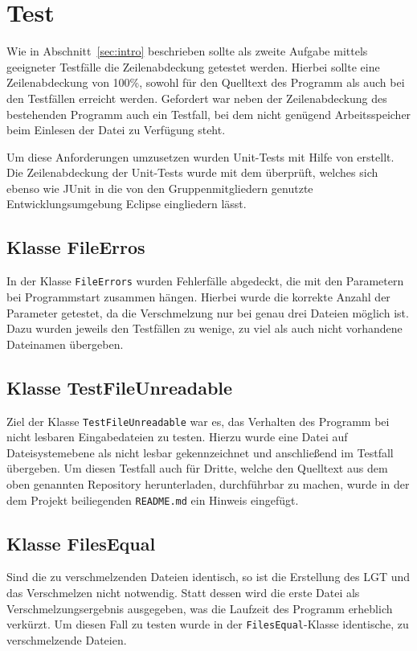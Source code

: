 \documentclass[a4paper,titlepage,12pt]{scrartcl}
\begin{document}
\section{Test}
\label{sec:test}

Wie in Abschnitt~\ref{sec:intro} beschrieben sollte als zweite Aufgabe mittels geeigneter Testfälle die Zeilenabdeckung getestet werden.
Hierbei sollte eine Zeilenabdeckung von 100\%, sowohl für den Quelltext des Programm als auch bei den Testfällen erreicht werden.
Gefordert war neben der Zeilenabdeckung des bestehenden Programm auch ein Testfall, bei dem nicht genügend Arbeitsspeicher beim Einlesen der Datei zu Verfügung steht.

Um diese Anforderungen umzusetzen wurden Unit-Tests mit Hilfe von \citep{www:JUNIT} erstellt. Die Zeilenabdeckung der Unit-Tests wurde mit dem \citep{www:ECLEMMA} überprüft, welches sich ebenso wie JUnit in die von den Gruppenmitgliedern genutzte Entwicklungsumgebung Eclipse eingliedern lässt.

\subsection{Klasse FileErros}
\label{sec:fileerrors}
In der Klasse \texttt{FileErrors} wurden Fehlerfälle abgedeckt, die mit den Parametern bei Programmstart zusammen hängen.
Hierbei wurde die korrekte Anzahl der Parameter getestet, da die Verschmelzung nur bei genau drei Dateien möglich ist.
Dazu wurden jeweils den Testfällen zu wenige, zu viel als auch nicht vorhandene Dateinamen übergeben.

\subsection{Klasse TestFileUnreadable}
\label{sec:fileunreadable}
Ziel der Klasse \texttt{TestFileUnreadable} war es, das Verhalten des Programm bei nicht lesbaren Eingabedateien zu testen.
Hierzu wurde eine Datei auf Dateisystemebene als nicht lesbar gekennzeichnet und anschließend im Testfall übergeben.
Um diesen Testfall auch für Dritte, welche den Quelltext aus dem oben genannten Repository herunterladen, durchführbar zu machen, wurde in der dem Projekt beiliegenden \texttt{README.md} ein Hinweis eingefügt.

\subsection{Klasse FilesEqual}
\label{sec:filesequal}
Sind die zu verschmelzenden Dateien identisch, so ist die Erstellung des LGT und das Verschmelzen nicht notwendig. Statt dessen wird die erste Datei als Verschmelzungsergebnis ausgegeben, was die Laufzeit des Programm erheblich verkürzt. Um diesen Fall zu testen wurde in der \texttt{FilesEqual}-Klasse identische, zu verschmelzende Dateien.
\end{document}
